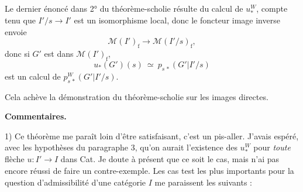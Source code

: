 \documentclass[11pt]{article}
\newcommand{\printedpage}[1]{\marginpar{\footnotesize p.~#1}}
\newcommand{\msp}[1]{\marginpar{\footnotesize [#1]}}
\newcommand{\M}{\mathcal{M}}
\newcommand{\rf}{\mathrm{f}}
\begin{document}
\printedpage{40}

\msp{page 72}

Le dernier énoncé dans 2° du théorème-scholie résulte du calcul de $u_*^W$, compte tenu que $I'/s \longrightarrow I'$ est un isomorphisme local, donc le foncteur image inverse envoie
\[
\M(I')_{\rf} \longrightarrow \M(I'/s)_{\rf},
\]
donc si $G'$ est dans $\M(I')_{\rf}$,
\[
u_*(G')(s) \ \simeq\ p_{s\,*}(G'|I'/s)
\]
est un calcul de $p^W_{s\,*}(G'|I'/s)$.

Cela achève la démonstration du théorème-scholie sur les images directes.

\textbf{Commentaires.}

1) Ce théorème me paraît loin d'être satisfaisant, c'est un pis-aller. J'avais espéré, avec les hypothèses du paragraphe 3, qu'on aurait l'existence des $u_*^W$ pour \textit{toute} flèche $u : I' \longrightarrow I$ dans Cat. Je doute à présent que ce soit le cas, mais n'ai pas encore réussi de faire un contre-exemple. Les cas test les plus importants pour la question d'admissibilité d'une catégorie $I$ me paraissent les suivants :
\end{document}

